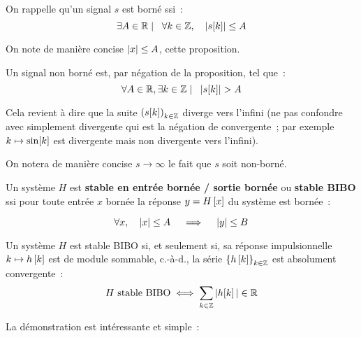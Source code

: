 \begin{remarque}
  On rappelle qu'un signal $s$ est borné ssi~:
  $$\exists A\in\mathbb{R} \mathrel{}\mid\mathrel{} \;\;{} \forall k\in \mathbb{Z}, \quad \left|s\!\left[k\right]\right|\leq A $$

  On note de manière concise $\left|x\right|\leq A$, cette proposition.

  Un signal non borné est, par négation de la proposition, tel que~:
  $$\forall A\in\mathbb{R}, \exists k\in \mathbb{Z} \mathrel{}\mid\mathrel{} \;\;  \left|s\!\left[k\right]\right| > A $$

  Cela revient à dire que la suite $\left(s\!\left[k\right]\right)_{k\in\mathbb{Z}}$ diverge
  vers l'infini (ne pas confondre avec simplement divergente qui est
  la négation de convergente~; par exemple $k\mapsto \sin\!\left[k\right]$ est
  divergente mais non divergente vers l'infini).

  On notera de manière concise $s\to\infty$ le fait que $s$ soit
  non-borné.
  
\end{remarque}

\begin{definition} Un système $H$ est \textbf{stable en entrée bornée
    / sortie bornée} ou \textbf{stable BIBO} ssi pour toute entrée $x$
  bornée la réponse $y=H\left[x\right]$ du système est bornée~:

  $$\forall x, \quad \left|x\right|\leq A \quad\implies\quad \left|y\right|\leq B $$
\end{definition}


\begin{theoreme}
  Un système $H$ est stable BIBO si, et seulement si, sa réponse
  impulsionnelle $k\mapsto h\left[k\right]$ est de module sommable, c.-à-d., la
  série $\left\{h\left[k\right]\right\}_{k\in\mathbb{Z}}$ est absolument convergente~:
  $$ H \text{ stable BIBO} \iff\sum\limits_{k\in\mathbb{Z}} |h\!\left[k\right]| \in \mathbb{R}$$
\end{theoreme}

La démonstration est intéressante et simple~:

